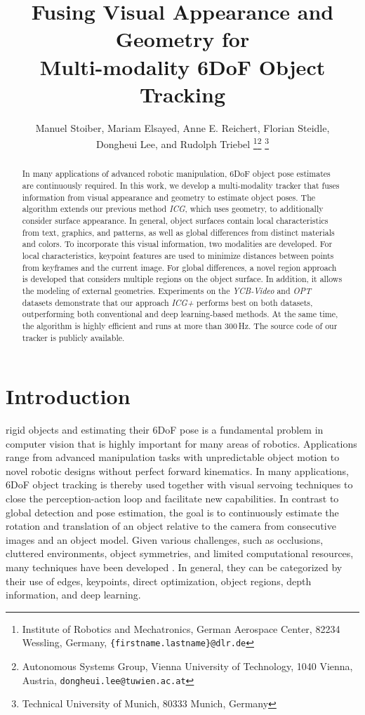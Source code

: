 \documentclass[letterpaper, 10 pt, conference]{ieeeconf}
\title{\LARGE \bf
Fusing Visual Appearance and Geometry for\\ Multi-modality 6DoF Object Tracking
}
\author{Manuel Stoiber, Mariam Elsayed, Anne E. Reichert, Florian Steidle,\\ Dongheui Lee, and Rudolph Triebel
	\thanks{ Institute of Robotics and Mechatronics, German Aerospace Center, 82234 Wessling, Germany, {\tt\small \{firstname.lastname\}@dlr.de}}\thanks{ Autonomous Systems Group, Vienna University of Technology, 1040 Vienna, Austria, {\tt\small dongheui.lee@tuwien.ac.at}}
	\thanks{ Technical University of Munich, 80333 Munich, Germany}}
\begin{document}
\maketitle
\thispagestyle{empty}
\pagestyle{empty}



\begin{abstract}
	In many applications of advanced robotic manipulation, \ac{6DoF} object pose estimates are continuously required.
	In this work, we develop a multi-modality tracker that fuses information from visual appearance and geometry to estimate object poses.
	The algorithm extends our previous method \textit{ICG}, which uses geometry, to additionally consider surface appearance.
	In general, object surfaces contain local characteristics from text, graphics, and patterns, as well as global differences from distinct materials and colors.
	To incorporate this visual information, two modalities are developed.
	For local characteristics, keypoint features are used to minimize distances between points from keyframes and the current image.
	For global differences, a novel region approach is developed that considers multiple regions on the object surface.
	In addition, it allows the modeling of external geometries.
	Experiments on the \textit{YCB-Video} and \textit{OPT} datasets demonstrate that our approach \textit{ICG+} performs best on both datasets, outperforming both conventional and deep learning-based methods.
	At the same time, the algorithm is highly efficient and runs at more than 300\,Hz.
	The source code of our tracker is publicly available.
\end{abstract}
 


\section{Introduction}\label{sec:in}
 rigid objects and estimating their \ac{6DoF} pose is a fundamental problem in computer vision that is highly important for many areas of
robotics.
Applications range from advanced manipulation tasks with unpredictable object motion to novel robotic designs without perfect forward kinematics.
In many applications, \ac{6DoF} object tracking is thereby used together with visual servoing techniques to close the perception-action loop and facilitate new capabilities.
In contrast to global detection and pose estimation, the goal is to continuously estimate the rotation and translation of an object relative to the camera from consecutive images and an object model.
Given various challenges, such as occlusions, cluttered environments, object symmetries, and limited computational resources, many techniques have been developed \cite{Lepetit2005, Yilmaz2006}.
In general, they can be categorized by their use of edges, keypoints,
direct optimization, object regions, depth information, and deep learning.
\end{document}
